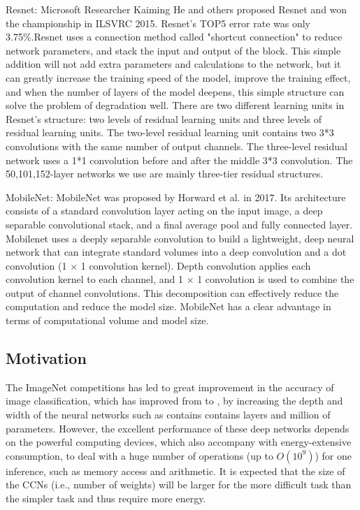 Resnet: Microsoft Researcher Kaiming He and others proposed Resnet and won the championship in ILSVRC 2015. Resnet's TOP5 error rate was only 3.75\%.Resnet uses a connection method called "shortcut connection" to reduce network parameters, and stack the input and output of the block. This simple addition will not add extra parameters and calculations to the network, but it can greatly increase the training speed of the model, improve the training effect, and when the number of layers of the model deepens, this simple structure can solve the problem of degradation well. There are two different learning units in Resnet's structure: two levels of residual learning units and three levels of residual learning units. The two-level residual learning unit contains two 3*3 convolutions with the same number of output channels. The three-level residual network uses a 1*1 convolution before and after the middle 3*3 convolution. The 50,101,152-layer networks we use are mainly three-tier residual structures.


MobileNet: MobileNet was proposed by Horward et al. in 2017. Its architecture consists of a standard convolution layer acting on the input image, a deep separable convolutional stack, and a final average pool and fully connected layer. Mobilenet uses a deeply separable convolution to build a lightweight, deep neural network that can integrate standard volumes into a deep convolution and a dot convolution (1 × 1 convolution kernel). Depth convolution applies each convolution kernel to each channel, and 1 × 1 convolution is used to combine the output of channel convolutions. This decomposition can effectively reduce the computation and reduce the model size. MobileNet has a clear advantage in terms of computational volume and model size.

\subsection{Motivation}
The ImageNet\FIXME{\cite{}} competitions has led to great improvement 
in the accuracy of image classification,
which has improved from \FIXME{\cite{}} to \FIXME{\cite{}},
by increasing the depth and width of the neural networks
such as  contains contains  layers and
 million of parameters.
However, the excellent performance of these deep networks 
depends on the powerful computing devices, which also accompany with
energy-extensive consumption, to deal with a huge number of operations (up to $O(10^9)$)
for one inference, such as memory access and arithmetic. 
It is expected that the size of the CCNs (i.e., number
of weights) will be larger for the more difficult task
than the simpler task and thus require
more energy.





